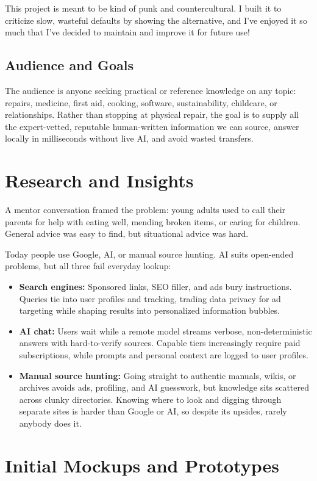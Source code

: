 \documentclass[10pt,letterpaper]{article}
\begin{document}
This project is meant to be kind of punk and countercultural. I built it to criticize slow, wasteful defaults by showing the alternative, and I've enjoyed it so much that I've decided to maintain and improve it for future use!

\subsection{Audience and Goals}
The audience is anyone seeking practical or reference knowledge on any topic: repairs, medicine, first aid, cooking, software, sustainability, childcare, or relationships. Rather than stopping at physical repair, the goal is to supply all the expert-vetted, reputable human-written information we can source, answer locally in milliseconds without live AI, and avoid wasted transfers.

\section{Research and Insights}

A mentor conversation framed the problem: young adults used to call their parents for help with eating well, mending broken items, or caring for children. General advice was easy to find, but situational advice was hard.

Today people use Google, AI, or manual source hunting. AI suits open-ended problems, but all three fail everyday lookup:
\begin{itemize}
    \item \textbf{Search engines:} Sponsored links, SEO filler, and ads bury instructions. Queries tie into user profiles and tracking, trading data privacy for ad targeting while shaping results into personalized information bubbles.
    \item \textbf{AI chat:} Users wait while a remote model streams verbose, non-deterministic answers with hard-to-verify sources. Capable tiers increasingly require paid subscriptions, while prompts and personal context are logged to user profiles.
    \item \textbf{Manual source hunting:} Going straight to authentic manuals, wikis, or archives avoids ads, profiling, and AI guesswork, but knowledge sits scattered across clunky directories. Knowing where to look and digging through separate sites is harder than Google or AI, so despite its upsides, rarely anybody does it.
\end{itemize}

\newpage
\section{Initial Mockups and Prototypes}
\end{document}
